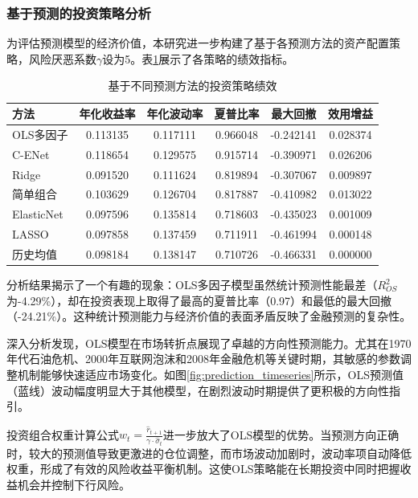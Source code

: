 \documentclass[12pt, a4paper]{article}
\begin{document}
\subsubsection{基于预测的投资策略分析}

为评估预测模型的经济价值，本研究进一步构建了基于各预测方法的资产配置策略，风险厌恶系数$\gamma$设为5。表\ref{tab:strategy_performance}展示了各策略的绩效指标。

\begin{table}[htbp]
\centering
\caption{基于不同预测方法的投资策略绩效}
\label{tab:strategy_performance}
\begin{tabular}{lccccc}
\toprule
方法 & 年化收益率 & 年化波动率 & 夏普比率 & 最大回撤 & 效用增益 \\
\midrule
OLS多因子 & 0.113135 & 0.117111 & 0.966048 & -0.242141 & 0.028374 \\
C-ENet & 0.118654 & 0.129575 & 0.915714 & -0.390971 & 0.026206 \\
Ridge & 0.091520 & 0.111624 & 0.819894 & -0.307067 & 0.009897 \\
简单组合 & 0.103629 & 0.126704 & 0.817887 & -0.410982 & 0.013022 \\
ElasticNet & 0.097596 & 0.135814 & 0.718603 & -0.435023 & 0.001009 \\
LASSO & 0.097858 & 0.137459 & 0.711911 & -0.461994 & 0.000148 \\
历史均值 & 0.098184 & 0.138147 & 0.710726 & -0.466331 & 0.000000 \\
\bottomrule
\end{tabular}
\end{table}

分析结果揭示了一个有趣的现象：OLS多因子模型虽然统计预测性能最差（$R^2_{OS}$为-4.29\%），却在投资表现上取得了最高的夏普比率（0.97）和最低的最大回撤（-24.21\%）。这种统计预测能力与经济价值的表面矛盾反映了金融预测的复杂性。

深入分析发现，OLS模型在市场转折点展现了卓越的方向性预测能力。尤其在1970年代石油危机、2000年互联网泡沫和2008年金融危机等关键时期，其敏感的参数调整机制能够快速适应市场变化。如图\ref{fig:prediction_timeseries}所示，OLS预测值（蓝线）波动幅度明显大于其他模型，在剧烈波动时期提供了更积极的方向性指引。

投资组合权重计算公式$w_t = \frac{\hat{r}_{t+1}}{\gamma \cdot \hat{\sigma}_t}$进一步放大了OLS模型的优势。当预测方向正确时，较大的预测值导致更激进的仓位调整，而市场波动加剧时，波动率项自动降低权重，形成了有效的风险收益平衡机制。这使OLS策略能在长期投资中同时把握收益机会并控制下行风险。
\end{document}
